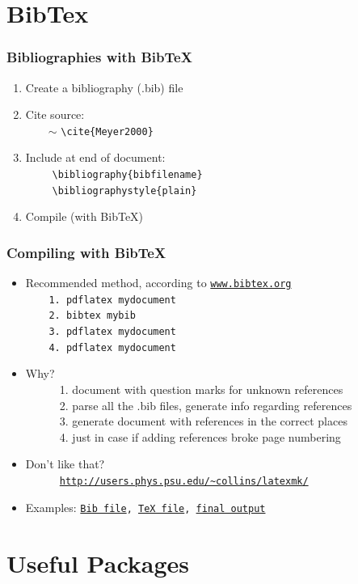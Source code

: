 \documentclass{beamer}
\newcommand{\pca}[2]
{
    \texttt{\textbackslash #1\{#2\}}
}
\begin{document}
\section{BibTex}
\begin{frame} \frametitle{Bibliographies with BibTeX}
  \begin{enumerate}
    \item Create a bibliography (.bib) file\\
     
    \item Cite source:\footnotesize\\
    \ \ \ \ $\sim$\pca{cite}{Meyer2000}\\\normalsize
    \item  Include at end of document: \\\footnotesize
	\ \ \ \ \pca{bibliography}{bibfilename} \\
	\ \ \ \ \pca{bibliographystyle}{plain}\normalsize
	\item Compile (with BibTeX)
  \end{enumerate}
\end{frame}

\begin{frame} \frametitle{Compiling with BibTeX}
\begin{itemize}
\item Recommended method, according to \texttt{\href{http://www.bibtex.org/Using/}{www.bibtex.org}}\texttt{\footnotesize\\
\ \ \ \ 1. pdflatex mydocument\\
\ \ \ \ 2. bibtex mybib\\
\ \ \ \ 3. pdflatex mydocument\\
\ \ \ \ 4. pdflatex mydocument\\
}
 \item Why?{\footnotesize\\
\ \ \ \ \ \ 1. document with question marks for unknown references\\
\ \ \ \ \ \ 2. parse all the .bib files, generate info regarding references\\
\ \ \ \ \ \ 3. generate document with references in the correct places\\
\ \ \ \ \ \ 4. just in case if adding references broke page numbering\\
}
\item Don't like that?\\
\ \ \ \ \ \ \texttt{\footnotesize\url{http://users.phys.psu.edu/~collins/latexmk/}}
\item Examples:  \texttt{\href{run:Examples/10-bibtex.bib}{Bib file}, \href{run:Examples/10-bibtex.tex}{TeX file}, \href{run:Examples/10-bibtex.pdf}{final output}}
\end{itemize}
\end{frame}

\section{Useful Packages}
\end{document}
